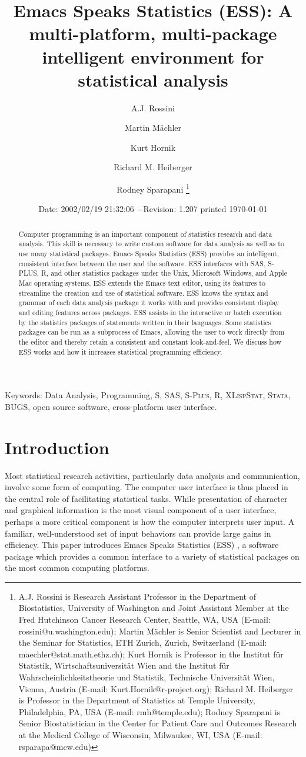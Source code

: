 \documentclass{article}
\title{Emacs Speaks Statistics (ESS): A multi-platform, multi-package
intelligent environment for statistical analysis}
\author{A.J. Rossini \and Martin M{\"a}chler \and Kurt Hornik \and Richard
  M. Heiberger \and Rodney Sparapani \footnote{%
    A.J. Rossini is Research Assistant Professor in the Department of
    Biostatistics, University of Washington and Joint Assistant Member at
    the Fred Hutchinson Cancer Research Center, Seattle, WA, USA
    (E-mail: rossini@u.washington.edu);
    Martin M{\"a}chler is Senior Scientist and Lecturer in the Seminar for
    Statistics, ETH Zurich, Zurich, Switzerland
    (E-mail: maechler@stat.math.ethz.ch);
    Kurt Hornik is Professor in the Institut f{\"u}r Statistik,
    Wirtschaftsuniversit{\"a}t Wien and the Institut f{\"u}r
    Wahrscheinlichkeitstheorie und Statistik, Technische Universit{\"a}t
    Wien, Vienna, Austria (E-mail: Kurt.Hornik@r-project.org);
    Richard M. Heiberger is Professor in the Department of Statistics at
    Temple University, Philadelphia, PA, USA (E-mail: rmh@temple.edu);
    Rodney Sparapani is Senior Biostatistician in the Center for Patient
    Care and Outcomes Research at the Medical College of Wisconsin, 
    Milwaukee, WI, USA (E-mail: rsparapa@mcw.edu)}}
\date{$ $Date: 2002/02/19 21:32:06 $ - $Revision: 1.207 $ $\tiny printed \today}
\newif\ifdraft
\renewcommand{\baselinestretch}{1.5}
\newcommand*{\SAS}{\textsc{SAS}}
\newcommand*{\Splus}{\textsc{S-Plus}}
\newcommand*{\XLispStat}{\textsc{XLispStat}}
\newcommand*{\Stata}{\textsc{Stata}}
\begin{document}

\ifdraft
\setcounter{page}{0}
\tableofcontents
\fi

\maketitle

\ifdraft{}%
\else%
 \renewcommand{\baselinestretch}{1.5}
\fi

\begin{abstract}
  Computer programming is an important component of statistics
  research and data analysis.  This skill is necessary to write custom
  software for data analysis as well as to use many statistical
  packages.  Emacs Speaks Statistics (ESS) provides an intelligent,
  consistent interface between the user and the software.  ESS
  interfaces with SAS, S-PLUS, R, and other statistics packages under
  the Unix, Microsoft Windows, and Apple Mac operating systems.  ESS
  extends the Emacs text editor, using its features to streamline the
  creation and use of statistical software.  ESS knows the syntax and
  grammar of each data analysis package it works with and provides
  consistent display and editing features across packages.  ESS
  assists in the interactive or batch execution by the statistics
  packages of statements written in their languages.  Some statistics
  packages can be run as a subprocess of Emacs, allowing the user to
  work directly from the editor and thereby retain a consistent and
  constant look-and-feel.  We discuss how ESS works and how it
  increases statistical programming efficiency.
\end{abstract}

\noindent Keywords: Data Analysis, Programming, 
S, \SAS, \Splus, R, \XLispStat, \Stata, BUGS, open source software,
cross-platform user interface.

\section{Introduction}
\label{sec:introduction}

Most statistical research activities, particularly data analysis and
communication, involve some form of computing.  The computer user
interface is thus placed in the central role of facilitating
statistical tasks.  While presentation of character and graphical
information is the most visual component of a user interface,
perhaps a more critical component is how the computer interprets user
input.  A familiar, well-understood set of input behaviors can provide
large gains in efficiency.  This paper introduces Emacs Speaks
Statistics (ESS) \citep{ESS}, a software package which provides a
common interface to a variety of statistical packages on the most
common computing platforms.
\end{document}

